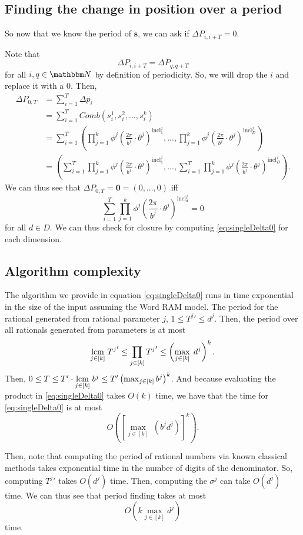 \documentclass[11pt,titlepage]{article}
\newcommand{\rationalPeriod}{{T^j}'}
\newcommand{\rationalPeriodTotal}{{T}'}
\newcommand{\totalPeriod}{T}
\newcommand{\totalStateNotime}{\pmb{s}}
\newcommand{\combWithState}[1]{Comb\left(s^1_{#1}, s^2_{#1}, ..., s^k_{#1}\right)}
\newcommand{\inclIndic}[2]{{\mathrm{incl}_{#1}^{#2}}}
\newcommand{\numbToAngle}{\frac{2\pi}{b^j}}
\newcommand{\digSumPeriodic}{\sigma^j}
\newcommand{\sinOrCos}{\phi^j}
\newcommand{\combSingleTerm}[1]{\prod_{j=1}^k \sinOrCos\left(\numbToAngle \cdot \theta^j\right) ^ {\inclIndic{#1}{j}}}
\begin{document}
\subsection{Finding the change in position over a period}
So now that we know the period of $\totalStateNotime$, we can ask if
$\Delta P_{i, i + T} = 0$.

Note that 
$$
\Delta P_{i, i + T} = \Delta P_{q, q + T}
$$
for all $i, q \in \N$ by definition of periodicity.
So, we will drop the $i$ and replace it with a $0$.
Then,
\begin{align*}
  \Delta P_{0, T} &= \sum_{i = 1}^T \Delta p_i \\
  &= \sum_{i = 1}^T \combWithState{i} \\
  &= \sum_{i = 1}^T \left(\combSingleTerm{1}, ..., \combSingleTerm{D}\right) \\
  &= \left(\sum_{i = 1}^T \combSingleTerm{1}, ..., \sum_{i = 1}^T \combSingleTerm{D}\right).
\end{align*}
We can thus see that $\Delta P_{0, T} = \pmb{0} = (0, ..., 0)$ iff 
\begin{equation}
\label{eq:singleDelta0}
\sum_{i = 1}^T \combSingleTerm{d} = 0
\end{equation}
for all $d \in D$.
We can thus check for closure by computing \eqref{eq:singleDelta0} for each dimension.

\subsection{Algorithm complexity}
The algorithm we provide in equation \eqref{eq:singleDelta0} runs in time exponential 
in the size of the input assuming the Word RAM model. 
The period for the rational generated from rational parameter $j$, $1 \leq \rationalPeriod \leq d^j$. Then,
the period over all rationals generated from parameters is at most 
$$
  \lcm{j \in [k]} \rationalPeriod \leq \prod_{j \in [k]} \rationalPeriod \leq \left(\max_{j \in [k]} \; d^j \right)^k.
$$
Then, 
$0 \leq \totalPeriod \leq \rationalPeriodTotal \cdot \lcm{j \in [k]} b^j \leq \rationalPeriodTotal \left(\max_{j \in [k]} b^j\right)^k$.
And because evaluating the product in \eqref{eq:singleDelta0} takes $O(k)$ time,
we have that the time for \eqref{eq:singleDelta0} is at most
$$
  O\left(\left[\max_{j \in [k]} \; (b^j d^j)\right]^k \right).
$$

Then, note that computing the period of rational numbers via known classical methods takes 
exponential time in the number of digits of the denominator. So, computing
$\rationalPeriod$ takes $O(d^j)$ time. Then, computing the $\digSumPeriodic$
can take $O(d^j)$ time. 
We can thus see that period finding takes at most
$$
O\left(k \max_{j \in [k]} d^j \right)
$$
time.
\end{document}

